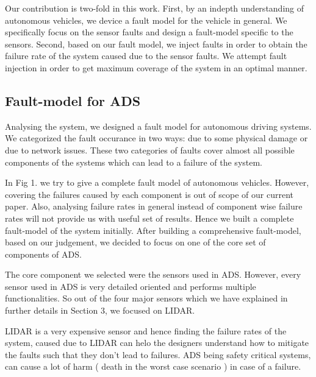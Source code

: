 

Our contribution is two-fold in this work. First, by an indepth understanding of autonomous vehicles, we device a fault model for the vehicle in general. We specifically focus on the sensor faults and design a fault-model specific to the sensors. Second, based on our fault model, we inject faults in order to obtain the failure rate of the system caused due to the sensor faults. We attempt fault injection in order to get maximum coverage of the system in an optimal manner.

\subsection{Fault-model for ADS}
Analysing the system, we designed a fault model for autonomous driving systems. We categorized the fault occurance in two ways: due to some physical damage or due to network issues. These two categories of faults cover almost all possible components of the systems which can lead to a failure of the system. 

In Fig 1. we try to give a complete fault model of autonomous vehicles. However, covering the failures caused by each component is out of scope of our current paper. Also, analysing failure rates in general instead of component wise failure rates will not provide us with useful set of results. Hence we built a complete fault-model of the system initially. After building a comprehensive fault-model, based on our judgement, we decided to focus on one of the core set of components of ADS.

 The core component we selected were the  sensors used in ADS. However, every sensor used in ADS is very detailed oriented and performs multiple functionalities. So out of the four major sensors which we have explained in further details in Section 3, we focused on LIDAR. 
 
 LIDAR is a very expensive sensor and hence finding the failure rates of the system, caused due to LIDAR can helo the designers understand how to mitigate the faults such that they don't lead to failures. ADS being safety critical systems, can cause a lot of harm ( death in the worst case scenario ) in case of a failure. 

